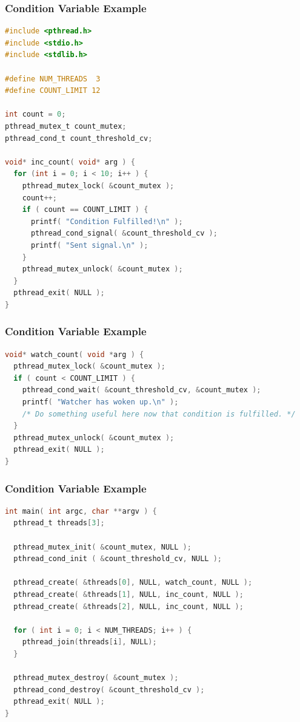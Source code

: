 \begin{frame}[fragile]
\frametitle{Condition Variable Example}

\begin{lstlisting}[language=C]
#include <pthread.h>
#include <stdio.h>
#include <stdlib.h>

#define NUM_THREADS  3
#define COUNT_LIMIT 12

int count = 0;
pthread_mutex_t count_mutex;
pthread_cond_t count_threshold_cv;

void* inc_count( void* arg ) {
  for (int i = 0; i < 10; i++ ) {
    pthread_mutex_lock( &count_mutex );
    count++;
    if ( count == COUNT_LIMIT ) {
      printf( "Condition Fulfilled!\n" );
      pthread_cond_signal( &count_threshold_cv );
      printf( "Sent signal.\n" );
    }
    pthread_mutex_unlock( &count_mutex );
  }
  pthread_exit( NULL );
}
\end{lstlisting}
\end{frame}

\begin{frame}[fragile]
\frametitle{Condition Variable Example}

\begin{lstlisting}[language=C]
void* watch_count( void *arg ) {
  pthread_mutex_lock( &count_mutex );  
  if ( count < COUNT_LIMIT ) {
    pthread_cond_wait( &count_threshold_cv, &count_mutex );
    printf( "Watcher has woken up.\n" );
    /* Do something useful here now that condition is fulfilled. */
  }
  pthread_mutex_unlock( &count_mutex );
  pthread_exit( NULL );
}
\end{lstlisting}
\end{frame}

\begin{frame}[fragile]
\frametitle{Condition Variable Example}
\begin{lstlisting}[language=C]
int main( int argc, char **argv ) {
  pthread_t threads[3];

  pthread_mutex_init( &count_mutex, NULL );
  pthread_cond_init ( &count_threshold_cv, NULL );

  pthread_create( &threads[0], NULL, watch_count, NULL );
  pthread_create( &threads[1], NULL, inc_count, NULL );
  pthread_create( &threads[2], NULL, inc_count, NULL );

  for ( int i = 0; i < NUM_THREADS; i++ ) {
    pthread_join(threads[i], NULL);
  }
  
  pthread_mutex_destroy( &count_mutex );
  pthread_cond_destroy( &count_threshold_cv );
  pthread_exit( NULL );
}
\end{lstlisting}
\end{frame}



